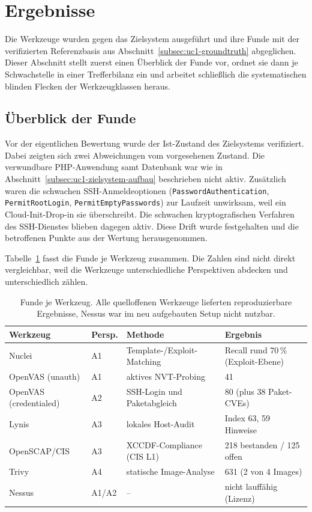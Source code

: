 \section{Ergebnisse}
\label{sec:uc1-ergebnisse}

Die Werkzeuge wurden gegen das Zielsystem ausgeführt und ihre Funde mit der verifizierten
Referenzbasis aus Abschnitt~\ref{subsec:uc1-groundtruth} abgeglichen. Dieser Abschnitt stellt zuerst
einen Überblick der Funde vor, ordnet sie dann je Schwachstelle in einer Trefferbilanz ein und
arbeitet schließlich die systematischen blinden Flecken der Werkzeugklassen heraus.

\subsection{Überblick der Funde}
\label{subsec:uc1-funde}

Vor der eigentlichen Bewertung wurde der Ist-Zustand des Zielsystems verifiziert. Dabei zeigten sich
zwei Abweichungen vom vorgesehenen Zustand. Die verwundbare PHP-Anwendung samt Datenbank war wie in
Abschnitt~\ref{subsec:uc1-zielsystem-aufbau} beschrieben nicht aktiv. Zusätzlich waren die schwachen
SSH-Anmeldeoptionen (\texttt{PasswordAuthentication}, \texttt{PermitRootLogin},
\texttt{PermitEmptyPasswords}) zur Laufzeit unwirksam, weil ein Cloud-Init-Drop-in sie überschreibt.
Die schwachen kryptografischen Verfahren des SSH-Dienstes blieben dagegen aktiv. Diese Drift wurde
festgehalten und die betroffenen Punkte aus der Wertung herausgenommen.

Tabelle~\ref{tab:uc1-kennzahlen} fasst die Funde je Werkzeug zusammen. Die Zahlen sind nicht direkt
vergleichbar, weil die Werkzeuge unterschiedliche Perspektiven abdecken und unterschiedlich zählen.

\begin{table}[H]
\centering
\footnotesize
\renewcommand{\arraystretch}{1.25}
\begin{tabular}{p{3.0cm}p{1.3cm}p{4.0cm}p{3.2cm}}
\hline
\textbf{Werkzeug} & \textbf{Persp.} & \textbf{Methode} & \textbf{Ergebnis} \\
\hline
Nuclei & A1 & Template-/Exploit-Matching & Recall rund 70\,\% (Exploit-Ebene) \\
OpenVAS (unauth) & A1 & aktives NVT-Probing & 41 \\
OpenVAS (credentialed) & A2 & SSH-Login und Paketabgleich & 80 (plus 38 Paket-CVEs) \\
Lynis & A3 & lokales Host-Audit & Index 63, 59 Hinweise \\
OpenSCAP/CIS & A3 & XCCDF-Compliance (CIS L1) & 218 bestanden / 125 offen \\
Trivy & A4 & statische Image-Analyse & 631 (2 von 4 Images) \\
Nessus & A1/A2 & -- & nicht lauffähig (Lizenz) \\
\hline
\end{tabular}
\caption{Funde je Werkzeug. Alle quelloffenen Werkzeuge lieferten reproduzierbare Ergebnisse, Nessus war im neu aufgebauten Setup nicht nutzbar.}
\label{tab:uc1-kennzahlen}
\end{table}

